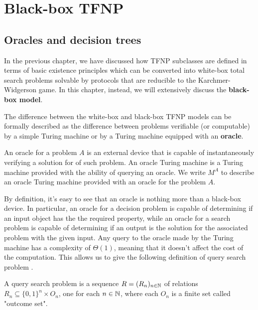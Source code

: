 
\chapter{Black-box TFNP} \label{chap:bb-tfnp}

\section{Oracles and decision trees}

In the previous chapter, we have discussed how \textsf{TFNP} subclasses are defined in terms of basic existence principles which can be converted into white-box total search problems solvable by protocols that are reducible to the Karchmer-Widgerson game. In this chapter, instead, we will extensively discuss the \textbf{black-box model}.

The difference between the white-box and black-box \textsf{TFNP} models can be formally described as the difference between problems verifiable (or computable) by a simple Turing machine or by a Turing machine equipped with an \textbf{oracle}. 

\begin{definition}
    An oracle for a problem $A$ is an external device that is capable of instantaneously verifying a solution for of such problem. An oracle Turing machine is a Turing machine provided with the ability of querying an oracle. We write $M^A$ to describe an oracle Turing machine provided with an oracle for the problem $A$.
\end{definition}

By definition, it's easy to see that an oracle is nothing more than a black-box device. In particular, an oracle for a decision problem is capable of determining if an input object has the the required property, while an oracle for a search problem is capable of determining if an output is the solution for the associated problem with the given input. Any query to the oracle made by the Turing machine has a complexity of $\Theta(1)$, meaning that it doesn't affect the cost of the computation. This allows us to give the following definition of query search problem \cite{proofs_circuits_communication, tfnp_characterization}.

\begin{definition}
    A query search problem is a sequence $R = (R_n)_{n \in \mathbb{N}}$ of relations $R_n \subseteq \{0,1\}^n \times O_n$, one for each $n \in \mathbb{N}$, where each $O_n$ is a finite set called "outcome set".
\end{definition}

